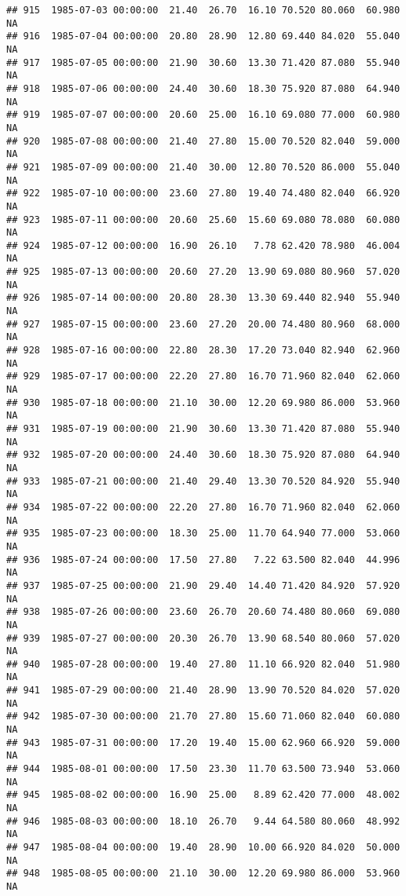 \documentclass{article}\usepackage{graphicx, color}
\makeatletter
\newenvironment{kframe}{%
 \def\at@end@of@kframe{}%
 \ifinner\ifhmode%
  \def\at@end@of@kframe{\end{minipage}}%
  \begin{minipage}{\columnwidth}%
 \fi\fi%
 \def\FrameCommand##1{\hskip\@totalleftmargin \hskip-\fboxsep
 \colorbox{shadecolor}{##1}\hskip-\fboxsep
     \hskip-\linewidth \hskip-\@totalleftmargin \hskip\columnwidth}%
 \MakeFramed {\advance\hsize-\width
   \@totalleftmargin\z@ \linewidth\hsize
   \@setminipage}}%
 {\par\unskip\endMakeFramed%
 \at@end@of@kframe}
\newenvironment{knitrout}{}{} %
\makeatother
\begin{document}
\begin{knitrout}
\begin{kframe}
\begin{verbatim}
## 915  1985-07-03 00:00:00  21.40  26.70  16.10 70.520 80.060  60.980     NA
## 916  1985-07-04 00:00:00  20.80  28.90  12.80 69.440 84.020  55.040     NA
## 917  1985-07-05 00:00:00  21.90  30.60  13.30 71.420 87.080  55.940     NA
## 918  1985-07-06 00:00:00  24.40  30.60  18.30 75.920 87.080  64.940     NA
## 919  1985-07-07 00:00:00  20.60  25.00  16.10 69.080 77.000  60.980     NA
## 920  1985-07-08 00:00:00  21.40  27.80  15.00 70.520 82.040  59.000     NA
## 921  1985-07-09 00:00:00  21.40  30.00  12.80 70.520 86.000  55.040     NA
## 922  1985-07-10 00:00:00  23.60  27.80  19.40 74.480 82.040  66.920     NA
## 923  1985-07-11 00:00:00  20.60  25.60  15.60 69.080 78.080  60.080     NA
## 924  1985-07-12 00:00:00  16.90  26.10   7.78 62.420 78.980  46.004     NA
## 925  1985-07-13 00:00:00  20.60  27.20  13.90 69.080 80.960  57.020     NA
## 926  1985-07-14 00:00:00  20.80  28.30  13.30 69.440 82.940  55.940     NA
## 927  1985-07-15 00:00:00  23.60  27.20  20.00 74.480 80.960  68.000     NA
## 928  1985-07-16 00:00:00  22.80  28.30  17.20 73.040 82.940  62.960     NA
## 929  1985-07-17 00:00:00  22.20  27.80  16.70 71.960 82.040  62.060     NA
## 930  1985-07-18 00:00:00  21.10  30.00  12.20 69.980 86.000  53.960     NA
## 931  1985-07-19 00:00:00  21.90  30.60  13.30 71.420 87.080  55.940     NA
## 932  1985-07-20 00:00:00  24.40  30.60  18.30 75.920 87.080  64.940     NA
## 933  1985-07-21 00:00:00  21.40  29.40  13.30 70.520 84.920  55.940     NA
## 934  1985-07-22 00:00:00  22.20  27.80  16.70 71.960 82.040  62.060     NA
## 935  1985-07-23 00:00:00  18.30  25.00  11.70 64.940 77.000  53.060     NA
## 936  1985-07-24 00:00:00  17.50  27.80   7.22 63.500 82.040  44.996     NA
## 937  1985-07-25 00:00:00  21.90  29.40  14.40 71.420 84.920  57.920     NA
## 938  1985-07-26 00:00:00  23.60  26.70  20.60 74.480 80.060  69.080     NA
## 939  1985-07-27 00:00:00  20.30  26.70  13.90 68.540 80.060  57.020     NA
## 940  1985-07-28 00:00:00  19.40  27.80  11.10 66.920 82.040  51.980     NA
## 941  1985-07-29 00:00:00  21.40  28.90  13.90 70.520 84.020  57.020     NA
## 942  1985-07-30 00:00:00  21.70  27.80  15.60 71.060 82.040  60.080     NA
## 943  1985-07-31 00:00:00  17.20  19.40  15.00 62.960 66.920  59.000     NA
## 944  1985-08-01 00:00:00  17.50  23.30  11.70 63.500 73.940  53.060     NA
## 945  1985-08-02 00:00:00  16.90  25.00   8.89 62.420 77.000  48.002     NA
## 946  1985-08-03 00:00:00  18.10  26.70   9.44 64.580 80.060  48.992     NA
## 947  1985-08-04 00:00:00  19.40  28.90  10.00 66.920 84.020  50.000     NA
## 948  1985-08-05 00:00:00  21.10  30.00  12.20 69.980 86.000  53.960     NA

\end{verbatim}
\end{kframe}
\end{knitrout}
\end{document}
